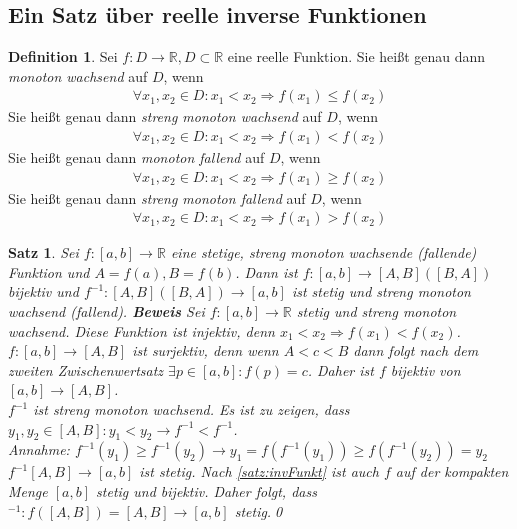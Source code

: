 \documentclass[ngerman,titlepage,twoside, parskip=half*]{scrreprt}
\newcommand*{\R}{\mathbb{R}}
\theoremstyle{plain}
\newtheorem{theorem}{Satz}[section]
\theoremstyle{definition}
\newtheorem{definition}{Definition}
\theoremstyle{remark}
\begin{document}
\subsection{Ein Satz über reelle inverse Funktionen}
\begin{definition}
Sei $f\colon D\rightarrow\R, D\subset \R$ eine reelle Funktion. Sie heißt genau dann \emph{monoton wachsend} auf $D$, wenn
\begin{gather*}\forall x_1,x_2\in D\colon x_1<x_2\Rightarrow f(x_1)\leq f(x_2)\end{gather*}
Sie heißt genau dann \emph{streng monoton wachsend} auf $D$, wenn
\begin{gather*}\forall x_1,x_2\in D\colon x_1<x_2\Rightarrow f(x_1)<f(x_2)\end{gather*}
Sie heißt genau dann \emph{monoton fallend} auf $D$, wenn
\begin{gather*}\forall x_1,x_2\in D\colon x_1<x_2\Rightarrow f(x_1)\geq f(x_2)\end{gather*}
Sie heißt genau dann \emph{streng monoton fallend} auf $D$, wenn
\begin{gather*}\forall x_1,x_2\in D\colon x_1<x_2\Rightarrow f(x_1)>f(x_2)\end{gather*}
\end{definition}

\begin{theorem}
  \label{satz:reellInvFkt}
Sei $f\colon[a,b]\rightarrow\R$ eine stetige, streng monoton wachsende (fallende) Funktion und $A=f(a), B=f(b)$. Dann ist
$f\colon[a,b]\rightarrow [A,B] ([B,A])$ bijektiv und $f^{-1}\colon[A,B]([B,A])\rightarrow [a,b]$ ist stetig und streng 
monoton wachsend (fallend).
\textbf{Beweis} Sei $f\colon[a,b]\rightarrow\R$ stetig und streng monoton wachsend. Diese Funktion ist injektiv, denn
$x_1<x_2\Rightarrow f(x_1)<f(x_2)$.\\
$f\colon[a,b]\rightarrow[A,B]$ ist surjektiv, denn wenn $A<c<B$ dann folgt nach dem zweiten Zwischenwertsatz $\exists
p\in [a,b]\colon f(p)=c$. Daher ist $f$ bijektiv von $[a,b]\rightarrow [A,B]$.\\
$f^{-1}$ ist streng monoton wachsend. Es ist zu zeigen, dass $y_1,y_2\in [A,B]\colon y_1<y_2\rightarrow f^{-1}<f^{-1}$.\\
Annahme: $f^{-1}(y_1)\geq f^{-1}(y_2)\rightarrow y_1=f(f^{-1}(y_1))\geq f(f^{-1}(y_2))=y_2$\textnormal{\lightning}\\
$f^{-1}[A,B]\rightarrow [a,b]$ ist stetig. Nach \autoref{satz:invFunkt} ist auch $f$ auf der kompakten Menge 
$[a,b]$ stetig und bijektiv. Daher folgt, dass $^{-1}\colon f([A,B])=[A,B]\rightarrow [a,b]$ stetig.\qed
\end{theorem}
\end{document}

